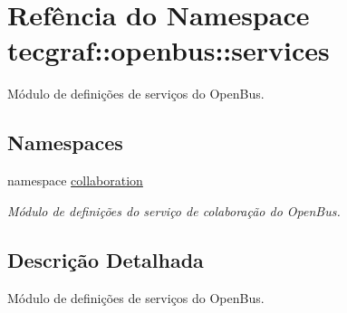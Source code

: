 \hypertarget{namespacetecgraf_1_1openbus_1_1services}{\section{\-Refência do \-Namespace tecgraf\-:\-:openbus\-:\-:services}
\label{namespacetecgraf_1_1openbus_1_1services}
}


\-Módulo de definições de serviços do \-Open\-Bus.  


\subsection*{\-Namespaces}
\begin{DoxyCompactItemize}
\item 
namespace \hyperlink{namespacetecgraf_1_1openbus_1_1services_1_1collaboration}{collaboration}
\begin{DoxyCompactList}\small\item\em \-Módulo de definições do serviço de colaboração do \-Open\-Bus. \end{DoxyCompactList}\end{DoxyCompactItemize}


\subsection{\-Descrição \-Detalhada}
\-Módulo de definições de serviços do \-Open\-Bus. 
